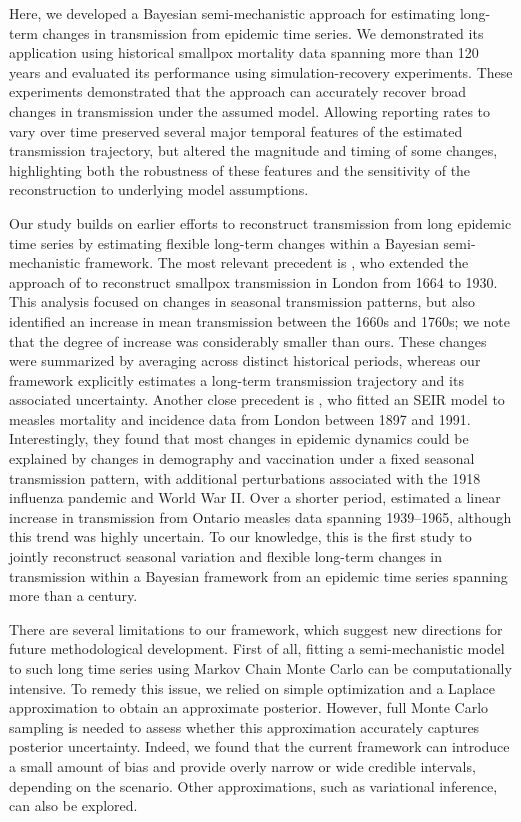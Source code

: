 \documentclass[12pt]{article}
\begin{document}
Here, we developed a Bayesian semi-mechanistic approach for estimating long-term changes in transmission from epidemic time series.
We demonstrated its application using historical smallpox mortality data spanning more than 120 years and evaluated its performance using simulation-recovery experiments. 
These experiments demonstrated that the approach can accurately recover broad changes in transmission under the assumed model.
Allowing reporting rates to vary over time preserved several major temporal features of the estimated transmission trajectory, but altered the magnitude and timing of some changes, highlighting both the robustness of these features and the sensitivity of the reconstruction to underlying model assumptions.

Our study builds on earlier efforts to reconstruct transmission from long epidemic time series by estimating flexible long-term changes within a Bayesian semi-mechanistic framework.
The most relevant precedent is \cite{krylova2011predicting}, who extended the approach of \cite{fine1982measles} to reconstruct smallpox transmission in London from 1664 to 1930. 
This analysis focused on changes in seasonal transmission patterns, but also identified an increase in mean transmission between the 1660s and 1760s;
we note that the degree of increase was considerably smaller than ours.
These changes were summarized by averaging across distinct historical periods, whereas our framework explicitly estimates a long-term transmission trajectory and its associated uncertainty.
Another close precedent is \cite{becker2019long}, who fitted an SEIR model to measles mortality and incidence data from London between 1897 and 1991. 
Interestingly, they found that most changes in epidemic dynamics could be explained by changes in demography and vaccination under a fixed seasonal transmission pattern, with additional perturbations associated with the 1918 influenza pandemic and World War II.
Over a shorter period, \cite{hooker2011parameterizing} estimated a linear increase in transmission from Ontario measles data spanning 1939–1965, although this trend was highly uncertain. 
To our knowledge, this is the first study to jointly reconstruct seasonal variation and flexible long-term changes in transmission within a Bayesian framework from an epidemic time series spanning more than a century.

There are several limitations to our framework, which suggest new directions for future methodological development.
First of all, fitting a semi-mechanistic model to such long time series using Markov Chain Monte Carlo can be computationally intensive.
To remedy this issue, we relied on simple optimization and a Laplace approximation to obtain an approximate posterior.
However, full Monte Carlo sampling is needed to assess whether this approximation accurately captures posterior uncertainty.
Indeed, we found that the current framework can introduce a small amount of bias and provide overly narrow or wide credible intervals, depending on the scenario.
Other approximations, such as variational inference, can also be explored.
\end{document}
